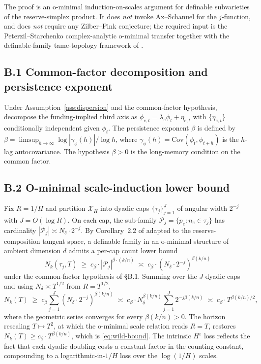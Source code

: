 The proof is an o-minimal induction-on-scales argument for
definable subvarieties of the reserve-simplex product. It does
\emph{not} invoke Ax--Schanuel for the $j$-function, and does
\emph{not} require any Zilber--Pink conjecture; the required input
is the Peterzil--Starchenko complex-analytic o-minimal transfer
\citep{PeterzilStarchenko2009} together with the definable-family
tame-topology framework of \citet{BakkerKlinglerTsimerman2020}.

\subsection*{B.1 Common-factor decomposition and persistence
exponent}

Under Assumption~\ref{ass:dispersion} and the common-factor
hypothesis, decompose the funding-implied third axis as
$\phi_{e,t} = \lambda_e \phi_t + \eta_{e,t}$
with $\{\eta_{e,t}\}$ conditionally independent given $\phi_t$. The
persistence exponent $\beta$ is defined by
$\beta = \limsup_{h \to \infty}
\log|\gamma_\phi(h)| / \log h$,
where $\gamma_\phi(h) = \mathrm{Cov}(\phi_t, \phi_{t+h})$ is the
$h$-lag autocovariance. The hypothesis $\beta > 0$ is the
long-memory condition on the common factor.

\subsection*{B.2 O-minimal scale-induction lower bound}

Fix $R = 1/H$ and partition $\mathcal{X}_H$ into dyadic caps
$\{\tau_j\}_{j=1}^{J}$ of angular width $2^{-j}$ with
$J = O(\log R)$. On each cap, the sub-family
$\mathcal{P}_j = \{p_e : n_e \in \tau_j\}$ has cardinality
$|\mathcal{P}_j| \asymp N_\delta \cdot 2^{-j}$. By
Corollary~2.2 of \citet{PeterzilStarchenko2009} adapted to the
reserve-composition tangent space, a definable family in an
o-minimal structure of ambient dimension $d$ admits a per-cap
count lower bound
\[
N_k(\tau_j, T) \;\ge\;
c_\beta \cdot |\mathcal{P}_j|^{\beta \cdot (k/n)}
\;\asymp\;
c_\beta \cdot (N_\delta \cdot 2^{-j})^{\beta(k/n)}
\]
under the common-factor hypothesis of \S B.1. Summing over the
$J$ dyadic caps and using $N_\delta \asymp T^{1/2}$ from
$R = T^{1/2}$,
\[
N_k(T) \;\ge\;
c_\beta \sum_{j=1}^{J}
(N_\delta \cdot 2^{-j})^{\beta(k/n)}
\;\asymp\;
c_\beta \cdot N_\delta^{\beta(k/n)}
\sum_{j=1}^{J} 2^{-j\beta(k/n)}
\;\asymp\;
c_\beta \cdot T^{\beta(k/n)/2},
\]
where the geometric series converges for every
$\beta(k/n) > 0$. The horizon rescaling $T \mapsto T^2$, at which
the o-minimal scale relation reads $R = T$, restores
$N_k(T) \ge c_\beta \cdot T^{\beta(k/n)}$, which is
\eqref{eq:wild-bound}. The intrinsic $H^\varepsilon$ loss
reflects the fact that each dyadic doubling costs a constant
factor in the counting constant, compounding to a
logarithmic-in-$1/H$ loss over the $\log(1/H)$ scales.

